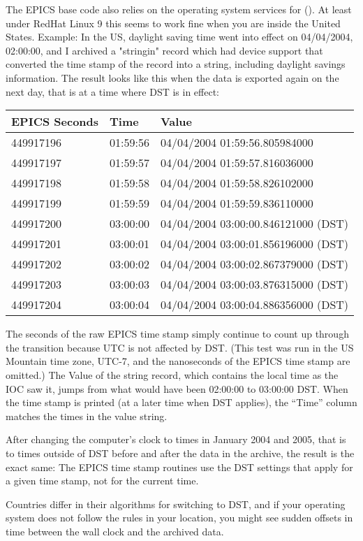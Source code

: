The EPICS base code also relies on the operating system services for
 (). At least under RedHat Linux 9 this
seems to work fine when you are inside the United States.
Example: In the US, daylight saving time went into effect on
04/04/2004, 02:00:00, and I archived a "stringin" record which had
device support that converted the time stamp of the record into a string,
including daylight savings information.
The result looks like this when the data is exported again
on the next day, that is at a time where DST is in effect:

\medskip
\begin{tabular}{lll}
EPICS Seconds & Time     & Value \\
\hline
449917196     & 01:59:56 & 04/04/2004 01:59:56.805984000 \\
449917197     & 01:59:57 & 04/04/2004 01:59:57.816036000 \\
449917198     & 01:59:58 & 04/04/2004 01:59:58.826102000 \\
449917199     & 01:59:59 & 04/04/2004 01:59:59.836110000 \\
449917200     & 03:00:00 & 04/04/2004 03:00:00.846121000 (DST) \\
449917201     & 03:00:01 & 04/04/2004 03:00:01.856196000 (DST) \\
449917202     & 03:00:02 & 04/04/2004 03:00:02.867379000 (DST) \\
449917203     & 03:00:03 & 04/04/2004 03:00:03.876315000 (DST) \\
449917204     & 03:00:04 & 04/04/2004 03:00:04.886356000 (DST) 
\end{tabular}

\medskip
\noindent The seconds of the raw EPICS time stamp simply continue to count up
through the transition because UTC is not affected by DST.
(This test was run in the US Mountain time zone, UTC-7, and the
nanoseconds of the EPICS time stamp are omitted.)
The Value of the string record, which contains the local time as the
IOC saw it, jumps from what would have been 02:00:00 to 03:00:00 DST.
When the time stamp is printed (at a later time when DST applies),
the ``Time'' column matches the times in the value string.

After changing the computer's clock to times in January 2004 and 2005,
that is to times outside of DST before and after the data in the
archive, the result is the exact same:
The EPICS time stamp routines use the DST settings that apply for a
given time stamp, not for the current time.

Countries differ in their algorithms for switching to DST, and if your
operating system does not follow the rules in your location, you might
see sudden offsets in time between the wall clock and the archived
data.
